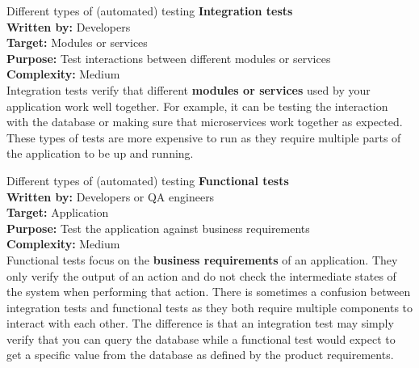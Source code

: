 \documentclass[
  ignorenonframetext,
  american,
  t,
  aspectratio=169]{beamer}
\begin{document}
\begin{frame}{Different types of (automated) testing}
\protect{}\label{different-types-of-automated-testing-4}
\textbf{Integration tests}\\
\textbf{Written by:} Developers\\
\textbf{Target:} Modules or services\\
\textbf{Purpose:} Test interactions between different modules or
services\\
\textbf{Complexity:} Medium\\
Integration tests verify that different \textbf{modules or services}
used by your application work well together. For example, it can be
testing the interaction with the database or making sure that
microservices work together as expected. These types of tests are more
expensive to run as they require multiple parts of the application to be
up and running.
\end{frame}

\begin{frame}{Different types of (automated) testing}
\protect{}\label{different-types-of-automated-testing-5}
\textbf{Functional tests}\\
\textbf{Written by:} Developers or QA engineers\\
\textbf{Target:} Application\\
\textbf{Purpose:} Test the application against business requirements\\
\textbf{Complexity:} Medium\\
Functional tests focus on the \textbf{business requirements} of an
application. They only verify the output of an action and do not check
the intermediate states of the system when performing that action. There
is sometimes a confusion between integration tests and functional tests
as they both require multiple components to interact with each other.
The difference is that an integration test may simply verify that you
can query the database while a functional test would expect to get a
specific value from the database as defined by the product requirements.
\end{frame}
\end{document}
